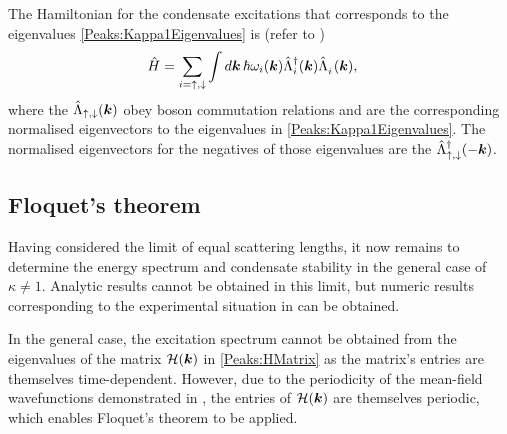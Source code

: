 The Hamiltonian for the condensate excitations that corresponds to the eigenvalues \eqref{Peaks:Kappa1Eigenvalues} is (refer to )
\begin{align}
    \hat{H} &= \sum_{i=\uparrow,\downarrow}\int d\bm{k}\, \hbar \omega_i(\bm{k}) \hat{\Lambda}_i^\dagger(\bm{k}) \hat{\Lambda}_i^{\phantom{\dagger}}(\bm{k}),
\end{align}
where the $\hat{\Lambda}_{\uparrow,\downarrow}(\bm{k})$ obey boson commutation relations and are the corresponding normalised eigenvectors to the eigenvalues in \eqref{Peaks:Kappa1Eigenvalues}. The normalised eigenvectors for the negatives of those eigenvalues are the $\hat{\Lambda}_{\uparrow, \downarrow}^\dagger(-\bm{k})$.

\subsection[Floquet's theorem]{Floquet's theorem~\citep[\S 3.2]{AppliedNonlinearDynamics}}
\label{Peaks:FloquetsTheorem}

Having considered the limit of equal scattering lengths, it now remains to determine the energy spectrum and condensate stability in the general case of $\kappa \neq 1$. Analytic results cannot be obtained in this limit, but numeric results corresponding to the experimental situation in  can be obtained.

In the general case, the excitation spectrum cannot be obtained from the eigenvalues of the matrix $\mathcal{H}(\bm{k})$ in \eqref{Peaks:HMatrix} as the matrix's entries are themselves time-dependent. However, due to the periodicity of the mean-field wavefunctions demonstrated in , the entries of $\mathcal{H}(\bm{k})$ are themselves periodic, which enables Floquet's theorem to be applied.

